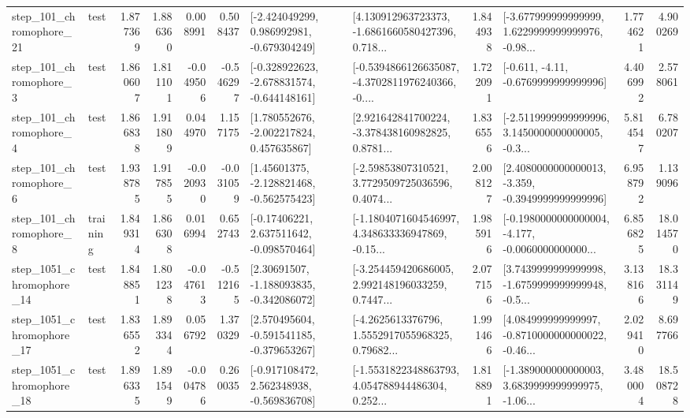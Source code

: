 \begin{tabular}{llrrrrllrlrr}
  step\_101\_chromophore\_21 &      test &      1.877369 &    1.886360 &      0.008991 &  0.508437 &   [-2.424049299, 0.986992981, -0.679304249] &  [4.130912963723373, -1.6861660580427396, 0.718... &       1.844938 &  [-3.677999999999999, 1.6229999999999976, -0.98... &            1.774621 &          4.900269 \\
   step\_101\_chromophore\_3 &      test &      1.860607 &    1.811101 &     -0.049506 & -0.546297 &  [-0.328922623, -2.678831574, -0.644148161] &  [-0.5394866126635087, -4.3702811976240366, -0.... &       1.722091 &               [-0.611, -4.11, -0.6769999999999996] &            4.406992 &          2.578061 \\
   step\_101\_chromophore\_4 &      test &      1.866838 &    1.911809 &      0.044970 &  1.157175 &    [1.780552676, -2.002217824, 0.457635867] &  [2.921642841700224, -3.378438160982825, 0.8781... &       1.836556 &  [-2.5119999999999996, 3.1450000000000005, -0.3... &            5.814547 &          6.780207 \\
   step\_101\_chromophore\_6 &      test &      1.938785 &    1.917855 &     -0.020930 & -0.031059 &    [1.45601375, -2.128821468, -0.562575423] &  [-2.59853807310521, 3.7729509725036596, 0.4074... &       2.008127 &  [2.4080000000000013, -3.359, -0.3949999999999996] &            6.958792 &          1.139096 \\
   step\_101\_chromophore\_8 &  training &      1.849314 &    1.866308 &      0.016994 &  0.652743 &    [-0.17406221, 2.637511642, -0.098570464] &  [-1.1804071604546997, 4.348633336947869, -0.15... &       1.985916 &  [-0.1980000000000004, -4.177, -0.0060000000000... &            6.856825 &         18.014570 \\
 step\_1051\_chromophore\_14 &      test &      1.848851 &    1.801238 &     -0.047613 & -0.512165 &    [2.30691507, -1.188093835, -0.342086072] &  [-3.254459420686005, 2.992148196033259, 0.7447... &       2.077156 &  [3.7439999999999998, -1.6759999999999948, -0.5... &            3.138166 &         18.331149 \\
 step\_1051\_chromophore\_17 &      test &      1.836552 &    1.893344 &      0.056792 &  1.370329 &   [2.570495604, -0.591541185, -0.379653267] &  [-4.2625613376796, 1.5552917055968325, 0.79682... &       1.991466 &  [4.084999999999997, -0.8710000000000022, -0.46... &            2.029410 &          8.697766 \\
 step\_1051\_chromophore\_18 &      test &      1.896335 &    1.891549 &     -0.004786 &  0.260035 &   [-0.917108472, 2.562348938, -0.569836708] &  [-1.5531822348863793, 4.054788944486304, 0.252... &       1.818891 &  [-1.389000000000003, 3.6839999999999975, -1.06... &            3.480004 &         18.508728 \\

\end{tabular}
